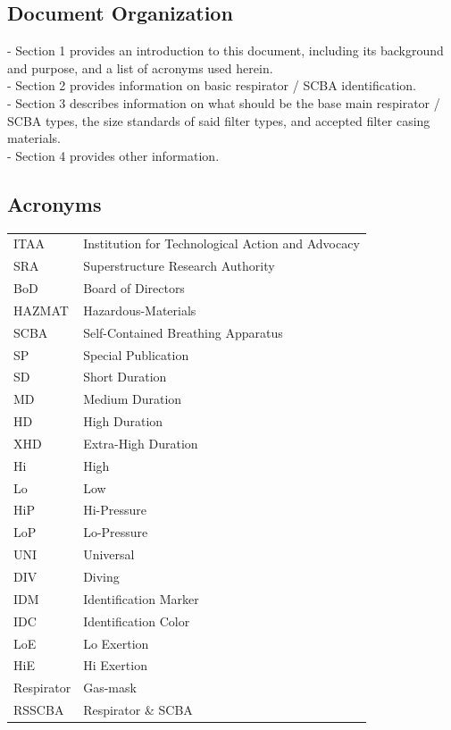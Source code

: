 \documentclass[a4paper, 12pt, oneside]{article}
\begin{document}
{			\subsection{Document Organization}
				- Section 1 provides an introduction to this document, including its background and purpose, and a list of acronyms used herein. \\
				- Section 2 provides information on basic respirator / SCBA identification. \\
				- Section 3 describes information on what should be the base main respirator / SCBA types, the size standards of said filter types, and accepted filter casing materials. \\
				- Section 4 provides other information.
				
				
		\newpage
				
			\subsection{Acronyms}
				\begin{tabular}{|p{2cm} p{10cm}}
					ITAA & Institution for Technological Action and Advocacy \\
					SRA & Superstructure Research Authority \\
					BoD & Board of Directors \\
					HAZMAT & Hazardous-Materials \\
					SCBA & Self-Contained Breathing Apparatus \\
					SP & Special Publication \\
					SD & Short Duration \\
					MD & Medium Duration \\
					HD & High Duration \\
					XHD & Extra-High Duration \\
					Hi & High \\
					Lo & Low \\
					HiP & Hi-Pressure \\
					LoP & Lo-Pressure \\
					UNI & Universal \\
					DIV & Diving \\
					IDM & Identification Marker \\
					IDC & Identification Color \\
					LoE & Lo Exertion \\
					HiE & Hi Exertion \\
					Respirator & Gas-mask \\
					RSSCBA & Respirator \& SCBA \\
				\end{tabular}
				
}
\end{document}
